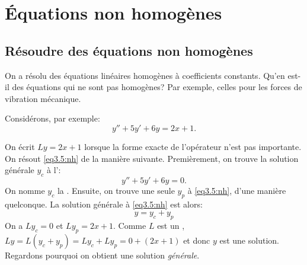 
\sectionnewpage
\section{Équations non homogènes }
\label{sec:nonhom}
%

\subsection{Résoudre des équations non homogènes }

On a résolu des équations linéaires homogènes à coefficients constants. 
Qu'en est-il des équations qui ne sont pas homogènes?
Par exemple, celles pour les forces de vibration mécanique. 


Considérons, par exemple:  
\begin{equation} \label{eq3.5:nh}
	y'' + 5y'+ 6y = 2x+1 .
\end{equation}

On écrit  $Ly = 2x+1$ lorsque la forme exacte de l'opérateur n'est pas importante. 
On résout \eqref{eq3.5:nh} de la manière suivante. 
Premièrement, on trouve la solution générale  $y_c$
à l'\emph{}: 
\begin{equation} \label{eq3.5:h}
	y'' + 5y'+ 6y = 0 .
\end{equation}
On nomme $y_c$ la \emph{}.
Ensuite, on trouve une seule \emph{} $y_p$ à \eqref{eq3.5:nh}, d'une manière quelconque.  La solution générale à \eqref{eq3.5:nh} est alors: 
\begin{equation*}
	y = y_c + y_p
\end{equation*}
On a  $L y_c = 0$ et $L y_p = 2x+1$.  
Comme $L$ est un \emph{}, 
$L y = L ( y_c + y_p) = L y_c + L y_p = 0 + (2x+1)$ 
et donc $y$ est une solution. Regardons pourquoi on obtient une  solution  \emph{générale}.

